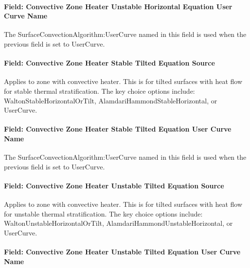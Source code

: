 \paragraph{Field: Convective Zone Heater Unstable Horizontal Equation User Curve Name}\label{field-convective-zone-heater-unstable-horizontal-equation-user-curve-name}

The SurfaceConvectionAlgorithm:UserCurve named in this field is used when the previous field is set to UserCurve.

\paragraph{Field: Convective Zone Heater Stable Tilted Equation Source}\label{field-convective-zone-heater-stable-tilted-equation-source}

Applies to zone with convective heater. This is for tilted surfaces with heat flow for stable thermal stratification. The key choice options include: WaltonStableHorizontalOrTilt, AlamdariHammondStableHorizontal, or UserCurve.

\paragraph{Field: Convective Zone Heater Stable Tilted Equation User Curve Name}\label{field-convective-zone-heater-stable-tilted-equation-user-curve-name}

The SurfaceConvectionAlgorithm:UserCurve named in this field is used when the previous field is set to UserCurve.

\paragraph{Field: Convective Zone Heater Unstable Tilted Equation Source}\label{field-convective-zone-heater-unstable-tilted-equation-source}

Applies to zone with convective heater. This is for tilted surfaces with heat flow for unstable thermal stratification. The key choice options include: WaltonUnstableHorizontalOrTilt, AlamdariHammondUnstableHorizontal, or UserCurve.

\paragraph{Field: Convective Zone Heater Unstable Tilted Equation User Curve Name}\label{field-convective-zone-heater-unstable-tilted-equation-user-curve-name}

